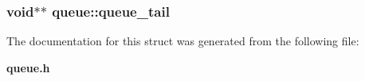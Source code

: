\subsubsection{\setlength{\rightskip}{0pt plus 5cm}void$\ast$$\ast$ \bf{queue::queue\_\-tail}}\label{structqueue_87b78ebb1770eafae99c8fa442a56b5c}




The documentation for this struct was generated from the following file:\begin{CompactItemize}
\item 
\bf{queue.h}\end{CompactItemize}
